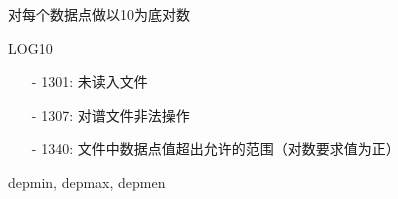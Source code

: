 \label{cmd:log10}

对每个数据点做以10为底对数

\begin{SACSTX}
LOG10
\end{SACSTX}

\begin{itemize}
\item[-]1301: 未读入文件
\item[-]1307: 对谱文件非法操作
\item[-]1340: 文件中数据点值超出允许的范围（对数要求值为正）
\end{itemize}

depmin, depmax, depmen
